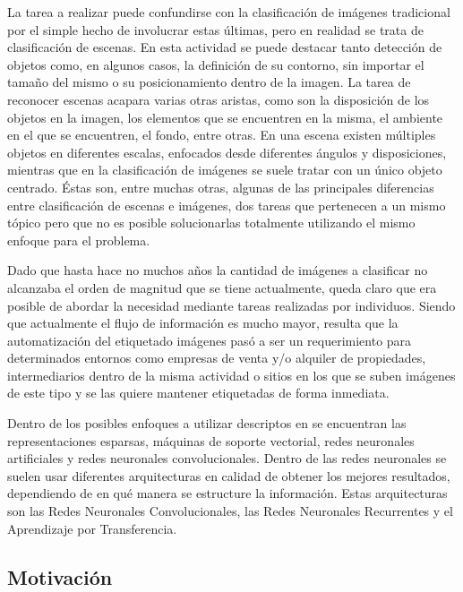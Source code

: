 La tarea a realizar puede confundirse con la clasificación de imágenes tradicional por el simple hecho de involucrar estas últimas, pero en realidad se trata de clasificación de escenas. En esta actividad se puede destacar tanto detección de objetos como, en algunos casos, la definición de su contorno, sin importar el tamaño del mismo o su posicionamiento dentro de la imagen. La tarea de reconocer escenas acapara varias otras aristas, como son la disposición de los objetos en la imagen, los elementos que se encuentren en la misma, el ambiente en el que se encuentren, el fondo, entre otras. En una escena existen múltiples objetos en diferentes escalas, enfocados desde diferentes ángulos y disposiciones, mientras que en la clasificación de imágenes se suele tratar con un único objeto centrado. Éstas son, entre muchas otras, algunas de las principales diferencias entre clasificación de escenas e imágenes, dos tareas que pertenecen a un mismo tópico pero que no es posible solucionarlas totalmente utilizando el mismo enfoque para el problema.

Dado que hasta hace no muchos años la cantidad de imágenes a clasificar no alcanzaba el orden de magnitud que se tiene actualmente, queda claro que era posible de abordar la necesidad mediante tareas realizadas por individuos. Siendo que actualmente el flujo de información es mucho mayor, resulta que la automatización del etiquetado imágenes pasó a ser un requerimiento para determinados entornos como empresas de venta y/o alquiler de propiedades, intermediarios dentro de la misma actividad o sitios en los que se suben imágenes de este tipo y se las quiere mantener etiquetadas de forma inmediata.

Dentro de los posibles enfoques a utilizar descriptos en \cite{comparation_techniques} se encuentran las representaciones esparsas, máquinas de soporte vectorial, redes neuronales artificiales y redes neuronales convolucionales. Dentro de las redes neuronales se suelen usar diferentes arquitecturas en calidad de obtener los mejores resultados, dependiendo de en qué manera se estructure la información. Estas arquitecturas son las Redes Neuronales Convolucionales, las Redes Neuronales Recurrentes y el Aprendizaje por Transferencia.


\subsection{Motivación}\label{sec:motivacion}

